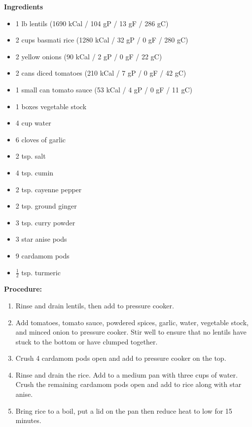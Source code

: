 \documentclass{report}
\begin{document}


\bigskip

\bigskip

\begin{multicols}{2}
\textbf{Ingredients}
\begin{itemize}
\item 1 lb lentils \newline (1690 kCal / 104 gP / 13 gF / 286 gC)
\item 2 cups basmati rice \newline (1280 kCal / 32 gP / 0 gF / 280 gC)
\item 2 yellow onions \quad (90 kCal / 2 gP / 0 gF / 22 gC)
\item 2 cans diced tomatoes \newline (210 kCal / 7 gP / 0 gF / 42 gC)
\item 1 small can tomato sauce \newline (53 kCal / 4 gP / 0 gF / 11 gC)
\item 1 boxes vegetable stock
\item 4 cup water 
\item 6 cloves of garlic
\item 2 tsp. salt
\item 4 tsp. cumin
\item 2 tsp. cayenne pepper
\item 2 tsp. ground ginger
\item 3 tsp. curry powder
\item 3 star anise pods
\item 9 cardamom pods
\item $\frac{1}{2}$ tsp. turmeric 


\end{itemize}


\columnbreak
\textbf{Procedure:}
\medskip


\begin{enumerate}

\item Rinse and drain lentils, then add to pressure cooker. 
\item Add tomatoes, tomato sauce, powdered spices, garlic, water, vegetable stock, and minced onion to pressure cooker. Stir well to ensure that no lentils have stuck to the bottom or have clumped together. 
\item Crush 4 cardamom pods open and add to pressure cooker on the top. 

\item Rinse and drain the rice. Add to a medium pan with three cups of water. Crush the remaining cardamom pods open and add to rice along with star anise. 
\item Bring rice to a boil, put a lid on the pan then reduce heat to low for 15 minutes. 


\end{enumerate}
\end{multicols}
\end{document}
